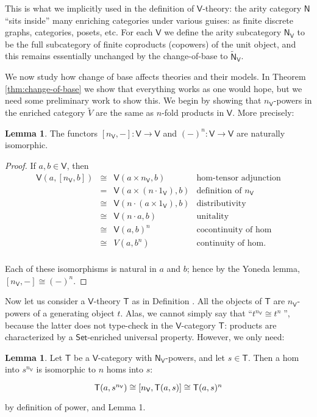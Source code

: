 \documentclass{amsart}
\theoremstyle{definition}
\newtheorem{lemma}[theorem]{Lemma}
\newcommand{\Set}{\mathsf{Set}}
\newcommand{\NN}{\mathsf{N}}
\newcommand{\V}{\mathsf{V}}
\newcommand{\T}{\mathsf{T}}
\newcommand{\maps}{\colon}
\begin{document}
This is what we implicitly used in the definition of $\V$-theory: the arity category $\NN$ ``sits inside'' many enriching categories under various guises: as finite discrete graphs, categories, posets, etc. For each $\V$ we define the arity subcategory $\NN_\V$ to be the full subcategory of finite coproducts (copowers) of the unit object, and this remains essentially unchanged by the change-of-base to $\tilde{\NN}_\V$.
\fi

We now study how change of base affects theories and their models.  In Theorem \ref{thm:change-of-base} we show that everything works as one would hope, but we need some preliminary work to
show this.  We begin by showing that $n_\V$-powers in the enriched category $\tilde{V}$ are
the same as $n$-fold products in $\V$.  More precisely:

\begin{lemma}
The functors $[n_\V,-]\maps \V\to \V$ and $(-)^n\maps \V\to \V$ are naturally isomorphic.  
\end{lemma}
\begin{proof}
	If $a,b \in \V$, then
	\[\begin{array}{rcll}
	\V(a,[n_\V,b]) & \cong & \V(a\times n_\V,b) & \text{hom-tensor adjunction}\\
	& = & \V(a\times (n \cdot 1_\V),b) & \text{definition of } n_\V\\
	& \cong & \V(n \cdot (a\times 1_\V),b) & \text{distributivity}\\
	& \cong & \V(n\cdot a,b) & \text{unitality}\\
	& \cong & \V(a,b)^n & \text{cocontinuity of hom}\\
	& \cong & V(a,b^n) & \text{continuity of hom}.\\
	\end{array}\]

Each of these isomorphisms is natural in $a$ and $b$; hence by the Yoneda lemma, $[n_\V,-] \cong (-)^n$.
\end{proof}

Now let us consider a $\V$-theory $\T$ as in Definition \label{defn:V-theory}.
All the objects of $\T$ are $n_\V$-powers of a generating object $t$. Alas, we cannot simply say that ``$t^{n_\V} \cong t^n\;$'', because the latter does not type-check in the $\V$-category $\T$: products are characterized by a $\Set$-enriched universal property. However, we only need:

\begin{lemma}
	Let $\T$ be a $\V$-category with $\NN_\V$-powers, and let $s \in \T$. Then a hom into $s^{n_\V}$ is isomorphic to $n$ homs into $s$: 
\[\begin{tikzcd} \T(a,s^{n_\V}) \cong [n_\V,\T(a,s)] \cong \T(a,s)^n \end{tikzcd}\] 
by definition of power, and Lemma 1.
\end{lemma}
\end{document}
